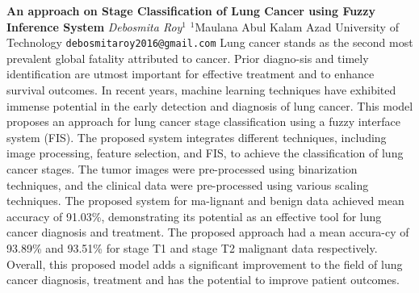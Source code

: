 
    \begin{conf-abstract}[]
        {\textbf{An approach on Stage Classification of Lung Cancer using Fuzzy Inference System}}
        {\textit{Debosmita Roy$^{1}$}}
        {$^{1}$Maulana Abul Kalam Azad University of Technology}
        {\texttt{debosmitaroy2016@gmail.com}}
        {Lung cancer stands as the second most prevalent global fatality attributed to cancer. Prior diagno-sis and timely identification are utmost important for effective treatment and to enhance survival outcomes. In recent years, machine learning techniques have exhibited immense potential in the early detection and diagnosis of lung cancer. This model proposes an approach for lung cancer stage classification using a fuzzy interface system (FIS). The proposed system integrates different techniques, including image processing, feature selection, and FIS, to achieve the classification of lung cancer stages. The tumor images were pre-processed using binarization techniques, and the clinical data were pre-processed using various scaling techniques. The proposed system for ma-lignant and benign data achieved mean accuracy of 91.03\%, demonstrating its potential as an effective tool for lung cancer diagnosis and treatment. The proposed approach had a mean accura-cy of 93.89\% and 93.51\% for stage T1 and stage T2 malignant data respectively. Overall, this proposed model adds a significant improvement to the field of lung cancer diagnosis, treatment and has the potential to improve patient outcomes.}
    \end{conf-abstract}
        